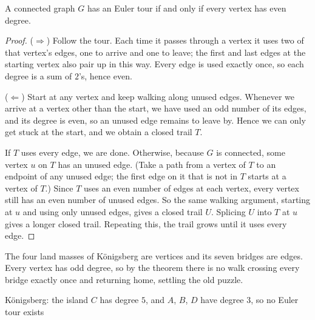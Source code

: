 \begin{theorem}[Euler, 1736]
A connected graph $G$ has an Euler tour if and only if every vertex has even degree.
\end{theorem}
\begin{proof}
($\Rightarrow$) Follow the tour. Each time it passes through a vertex it uses two of that vertex's edges, one to arrive and one to leave; the first and last edges at the starting vertex also pair up in this way. Every edge is used exactly once, so each degree is a sum of $2$'s, hence even.

($\Leftarrow$) Start at any vertex and keep walking along unused edges. Whenever we arrive at a vertex other than the start, we have used an odd number of its edges, and its degree is even, so an unused edge remains to leave by. Hence we can only get stuck at the start, and we obtain a closed trail $T$.

If $T$ uses every edge, we are done. Otherwise, because $G$ is connected, some vertex $u$ on $T$ has an unused edge. (Take a path from a vertex of $T$ to an endpoint of any unused edge; the first edge on it that is not in $T$ starts at a vertex of $T$.) Since $T$ uses an even number of edges at each vertex, every vertex still has an even number of unused edges. So the same walking argument, starting at $u$ and using only unused edges, gives a closed trail $U$. Splicing $U$ into $T$ at $u$ gives a longer closed trail. Repeating this, the trail grows until it uses every edge.
\end{proof}

\begin{note}[Königsberg]
The four land masses of Königsberg are vertices and its seven bridges are edges. Every vertex has odd degree, so by the theorem there is no walk crossing every bridge exactly once and returning home, settling the old puzzle.
\end{note}

\begin{center}
\end{center}
\begin{center}
\small Königsberg: the island $C$ has degree $5$, and $A$, $B$, $D$ have degree $3$, so no Euler tour exists
\end{center}

